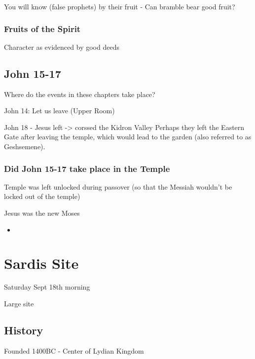 \documentclass[
]{book}
\providecommand{\tightlist}{%
  \setlength{\itemsep}{0pt}\setlength{\parskip}{0pt}}
\begin{document}
You will know (false prophets) by their fruit - Can bramble bear good fruit?

\hypertarget{fruits-of-the-spirit}{%
\subsection{Fruits of the Spirit}\label{fruits-of-the-spirit}}

Character as evidenced by good deeds

\hypertarget{john-15-17}{%
\section{John 15-17}\label{john-15-17}}

Where do the events in these chapters take place?

John 14: Let us leave (Upper Room)

John 18 - Jesus left -\textgreater{} corssed the Kidron Valley
Perhaps they left the Eastern Gate after leaving the temple, which would lead to the garden (also referred to as Geshsemene).

\hypertarget{did-john-15-17-take-place-in-the-temple}{%
\subsection{Did John 15-17 take place in the Temple}\label{did-john-15-17-take-place-in-the-temple}}

Temple was left unlocked during passover (so that the Messiah wouldn't be locked out of the temple)

Jesus was the new Moses

\begin{itemize}
\tightlist
\item
\end{itemize}

\hypertarget{sardis-site}{%
\chapter{Sardis Site}\label{sardis-site}}

Saturday Sept 18th morning

Large site

\hypertarget{history-3}{%
\section{History}\label{history-3}}

Founded 1400BC - Center of Lydian Kingdom
\end{document}
